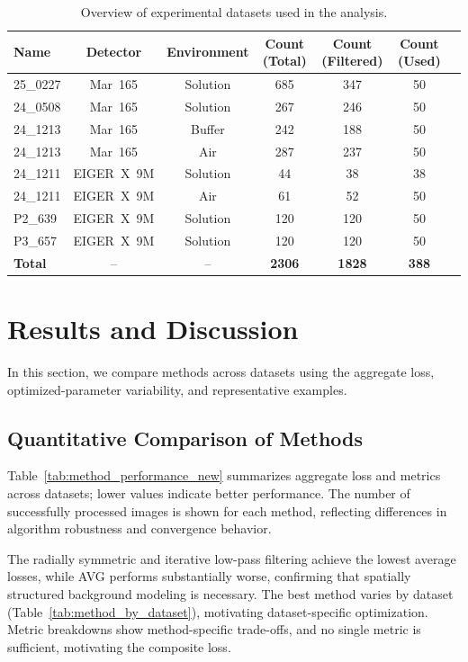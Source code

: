 \documentclass[iucr]{iucrjournals}
\begin{document}
\begin{table}[t]
\caption{Overview of experimental datasets used in the analysis.}
\label{tab:datasets}
\centering
\small
\setlength{\tabcolsep}{4pt}
\renewcommand{\arraystretch}{1.0}
\begin{tabular}{@{}lcccccc@{}}
\toprule
Name & Detector & Environment & Count (Total) & Count (Filtered) & Count (Used) \\ \midrule
25\_0227 & Mar~165 & Solution & 685 & 347 & 50 \\
24\_0508 & Mar~165 & Solution & 267 & 246 & 50 \\
24\_1213 & Mar~165 & Buffer & 242 & 188 & 50 \\
24\_1213 & Mar~165 & Air & 287 & 237 & 50 \\
24\_1211 & EIGER~X~9M & Solution & 44 & 38 & 38 \\
24\_1211 & EIGER~X~9M & Air & 61 & 52 & 50 \\
P2\_639 & EIGER~X~9M & Solution & 120 & 120 & 50 \\
P3\_657 & EIGER~X~9M & Solution & 120 & 120 & 50 \\ \midrule
\textbf{Total} & -- & -- & \textbf{2306} & \textbf{1828} & \textbf{388} \\
\bottomrule
\end{tabular}
\end{table}




\section{Results and Discussion}

In this section, we compare methods across datasets using the aggregate loss, optimized-parameter variability, and representative examples.

\subsection{Quantitative Comparison of Methods}

Table~\ref{tab:method_performance_new} summarizes aggregate loss and metrics across datasets; lower values indicate better performance. The number of successfully processed images is shown for each method, reflecting differences in algorithm robustness and convergence behavior.

The radially symmetric and iterative low-pass filtering achieve the lowest average losses, while AVG performs substantially worse, confirming that spatially structured background modeling is necessary. The best method varies by dataset (Table~\ref{tab:method_by_dataset}), motivating dataset-specific optimization. Metric breakdowns show method-specific trade-offs, and no single metric is sufficient, motivating the composite loss.
\end{document}
